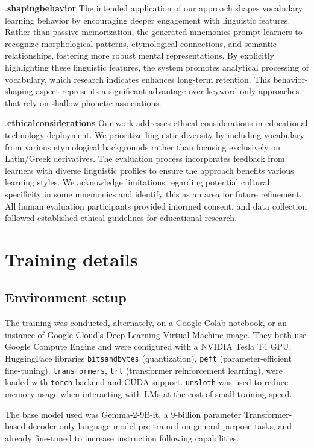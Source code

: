 \documentclass{article}
\newcounter{para}
\newcommand\numpara{\par\refstepcounter{para}{\thepara}.\space\textbf}
\begin{document}
\numpara{shapingbehavior} The intended application of our approach shapes vocabulary learning behavior by encouraging deeper engagement with linguistic features. Rather than passive memorization, the generated mnemonics prompt learners to recognize morphological patterns, etymological connections, and semantic relationships, fostering more robust mental representations. By explicitly highlighting these linguistic features, the system promotes analytical processing of vocabulary, which research indicates enhances long-term retention. This behavior-shaping aspect represents a significant advantage over keyword-only approaches that rely on shallow phonetic associations.

\numpara{ethicalconsiderations} Our work addresses ethical considerations in educational technology deployment. We prioritize linguistic diversity by including vocabulary from various etymological backgrounds rather than focusing exclusively on Latin/Greek derivatives. The evaluation process incorporates feedback from learners with diverse linguistic profiles to ensure the approach benefits various learning styles. We acknowledge limitations regarding potential cultural specificity in some mnemonics and identify this as an area for future refinement. All human evaluation participants provided informed consent, and data collection followed established ethical guidelines for educational research.

\section{Training details} \label{sec:training-details}
\subsection{Environment setup}
The training was conducted, alternately, on a Google Colab notebook, or an instance of Google Cloud's Deep Learning Virtual Machine image. They both use Google Compute Engine and were configured with a NVIDIA Tesla T4 GPU. HuggingFace libraries \verb|bitsandbytes| (quantization), \verb|peft| (parameter-efficient fine-tuning), \verb|transformers|, \verb|trl| (transformer reinforcement learning), were loaded with \verb|torch| backend and CUDA support. \verb|unsloth| was used to reduce memory usage when interacting with LMs at the cost of small training speed.

The base model used was Gemma-2-9B-it, a 9-billion parameter Transformer-based decoder-only language model pre-trained on general-purpose tasks, and already fine-tuned to increase instruction following capabilities.
\end{document}
